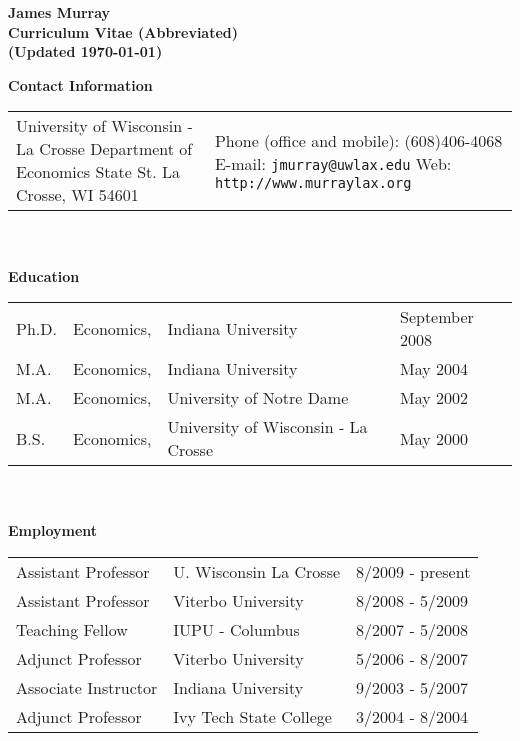 \documentclass[11pt]{article}
\newcommand{\toprule}{\par\vspace*{2pt}\noindent{\hrule\hfill}\par\vspace*{1pt}}
\begin{document}
\newpage
\nocite{*}


 \newpage

\begin{center} 
\textbf{\Large{James Murray}}\\
\textbf{Curriculum Vitae (Abbreviated)}\\
\textbf{(Updated \today)}\end{center}
\small 

\noindent \textbf{Contact Information} \toprule
\hspace*{-0.5pc}\begin{tabular}{p{3.4in} p{3in}}
University of Wisconsin - La Crosse\newline
Department of Economics \newline
1725 State St. \newline
La Crosse, WI  54601
&
Phone (office and mobile): (608)406-4068\newline
E-mail: \texttt{jmurray@uwlax.edu}\newline
Web: \texttt{http://www.murraylax.org}
\end{tabular} \\ \\

\noindent \textbf{Education} \toprule
\hspace*{-0.5pc}\begin{tabular}{p{.5in} p{.6in} p{2.5in} p{2in}}
Ph.D. & Economics, & Indiana University & September 2008 \\
M.A. & Economics, & Indiana University & May 2004  \\
M.A. & Economics, & University of Notre Dame & May 2002 \\
B.S. & Economics, & University of Wisconsin - La Crosse & May 2000 \\
\end{tabular} \\ \\

\noindent \textbf{Employment} \toprule
\hspace*{-0.5pc}\begin{tabular}{p{1.5in} p{1.7in} p{1.5in}}
Assistant Professor & U. Wisconsin La Crosse & 8/2009 - present \\
Assistant Professor & Viterbo University & 8/2008 - 5/2009 \\
Teaching Fellow & IUPU - Columbus & 8/2007 - 5/2008 \\
Adjunct Professor & Viterbo University & 5/2006 - 8/2007 \\
Associate Instructor & Indiana University & 9/2003 - 5/2007 \\
Adjunct Professor & Ivy Tech State College & 3/2004 - 8/2004 \\
\end{tabular} \\ \\
\end{document}

